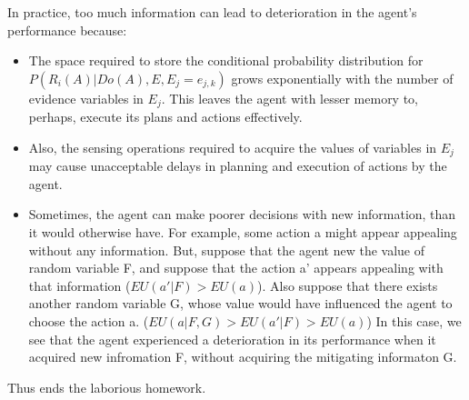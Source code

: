 \documentclass[10pt]{article}
\begin{document}
In practice, too much information can lead to deterioration in the agent's performance because:
\begin{itemize}
 \item The space required to store the conditional probability distribution for $P(R_{i}(A)|Do(A),E,E_{j}=e_{j,k})$ grows exponentially with the number of evidence variables in $E_{j}$. This leaves the agent with lesser memory to, perhaps, execute its plans and actions effectively.
 \item Also, the sensing operations required to acquire the values of variables in $E_{j}$ may cause unacceptable delays in planning and execution of actions by the agent.
 \item Sometimes, the agent can make poorer decisions with new information, than it would otherwise have. For example, some action a might appear appealing without any information. But, suppose that the agent new the value of random variable F, and suppose that the action a' appears appealing with that information ($EU(a'|F)>EU(a)$). Also suppose that there exists another random variable G, whose value would have influenced the agent to choose the action a. ($EU(a|F,G)>EU(a'|F)>EU(a)$) In this case, we see that the agent experienced a deterioration in its performance when it acquired new infromation F, without acquiring the mitigating informaton G.
\end{itemize}

\begin{tiny}Thus ends the laborious homework.\end{tiny}
\end{document}
